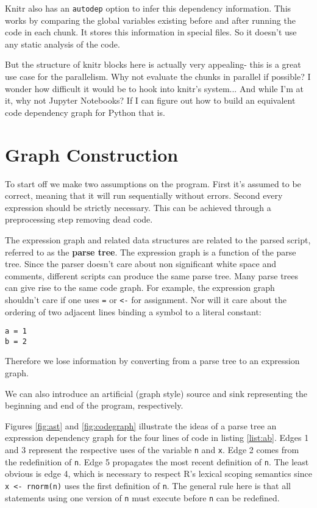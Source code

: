 \documentclass[12pt]{article}
\begin{document}
Knitr also has an \texttt{autodep} option to infer this dependency
information. This works by comparing the global variables existing before
and after running the code in each chunk. It stores this information in
special files. So it doesn't use any static analysis of the code.

But the structure of knitr blocks here is actually very appealing- this is
a great use case for the parallelism. Why not evaluate the chunks in
parallel if possible? I wonder how difficult it would be to hook into
knitr's system... And while I'm at it, why not Jupyter Notebooks? If I can
figure out how to build an equivalent code dependency graph for Python that
is.

\section{Graph Construction}

To start off we make two assumptions on the program. First it's assumed to
be correct, meaning that it will run sequentially without errors.
Second every expression should be strictly necessary. This can be achieved
through a preprocessing step removing dead code.

The expression graph and related data structures are related to the parsed
script, referred to as the \textbf{parse tree}. The expression
graph is a function of the parse tree. Since the parser
doesn't care about non significant white space and comments,  different
scripts can produce the same parse tree.  Many parse trees can give rise to
the same code graph. For example, the expression graph shouldn't care if one uses
\texttt{=} or \texttt{<-} for assignment. Nor will it care about the
ordering of two adjacent lines binding a symbol to a literal constant:

\begin{verbatim}
a = 1
b = 2
\end{verbatim}

Therefore we lose information by converting from a parse tree to an
expression graph.

We can also introduce an artificial (graph style) source and sink representing the
beginning and end of the program, respectively.

Figures \ref{fig:ast} and \ref{fig:codegraph} illustrate the ideas of
a parse tree an expression dependency
graph for the four lines of code in listing \ref{list:ab}.  Edges 1 and 3
represent the respective uses of the variable \texttt{n} and \texttt{x}.
Edge 2 comes from the redefinition of \texttt{n}.  Edge 5 propagates the
most recent definition of \texttt{n}.  The least obvious is edge 4, which
is necessary to respect R's lexical scoping semantics since \texttt{x <-
rnorm(n)} uses the first definition of \texttt{n}. The general rule here is
that all statements using one version of \texttt{n} must execute before
\texttt{n} can be redefined.
\end{document}
